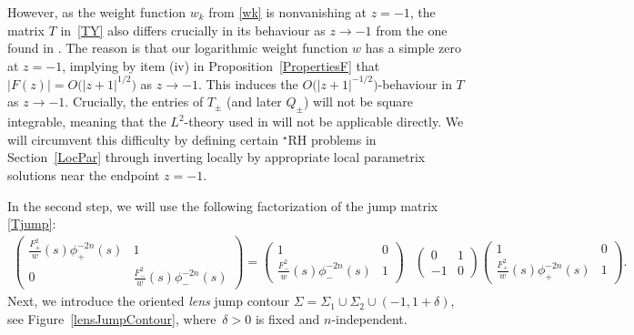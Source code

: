 \documentclass[11pt]{article}
\numberwithin{equation}{section}
\numberwithin{equation}{section}
\begin{document}
However, as the weight function $w_k$ from \eqref{wk} is nonvanishing at $z = -1$, the matrix $T$ in~\eqref{TY} also differs crucially in its behaviour as $z\to-1$ from the one found in \cite[equation~(3.7)]{CD}. The reason is that our logarithmic weight function $w$ has a simple zero at $z=-1$, implying by item (iv) in Proposition~\ref{PropertiesF} that $|F(z)| = O\big(|z+1|^{1/2}\big)$ as $z \to -1$. This induces the $O\big(|z+1|^{-1/2}\big)$-behaviour in $T$ as $z\to-1$. Crucially, the entries of $T_\pm$ (and later $Q_\pm$) will not be square integrable, meaning that the $L^2$-theory used in \cite{CD} will not be applicable directly. We will circumvent this difficulty by defining certain ${}^\star$RH problems in Section~\ref{LocPar} through inverting locally by appropriate local parametrix solutions near the endpoint $z = -1$.

In the second step, we will use the following factorization of the jump matrix \eqref{Tjump}:
\begin{align*}
 \begin{pmatrix}
 \frac{F_+^2}{w}(s)\phi_+^{-2n}(s) & 1
 \\
 0 & \frac{F_-^2}{w}(s)\phi_-^{-2n}(s)
 \end{pmatrix} = \begin{pmatrix}
 1 & 0
 \\
 \frac{F_-^2}{w}(s)\phi_-^{-2n}(s) & 1
 \end{pmatrix}&
 \begin{pmatrix}
 0 & 1
 \\
 -1 & 0
 \end{pmatrix}
 \begin{pmatrix}
 1 & 0
 \\
 \frac{F_+^2}{w}(s)\phi_+^{-2n}(s) & 1
 \end{pmatrix}.
\end{align*}
Next, we introduce the oriented \emph{lens} jump contour $\Sigma = \Sigma_1 \cup \Sigma_2 \cup (-1,1+\delta)$, see Figure~\ref{lensJumpContour}, where~$\delta > 0$ is fixed and $n$-independent.
\end{document}
